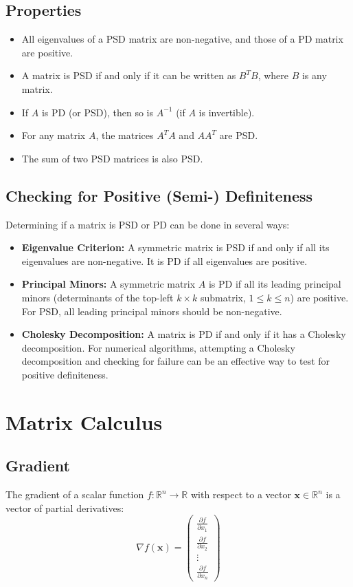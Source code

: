 \documentclass[8pt, a4paper, landscape, includeheadfoot]{extarticle}
\begin{document}
\begin{multicols*}{4}
	\subsection{Properties}
	\begin{itemize}
		\item All eigenvalues of a PSD matrix are non-negative, and those of a PD matrix are positive.
		\item A matrix is PSD if and only if it can be written as \( B^T B \), where \( B \) is any matrix.
		\item If \( A \) is PD (or PSD), then so is \( A^{-1} \) (if \( A \) is invertible).
		\item For any matrix \( A \), the matrices \( A^T A \) and \( AA^T \) are PSD.
		\item The sum of two PSD matrices is also PSD.
	\end{itemize}

	\subsection{Checking for Positive (Semi-) Definiteness}
	Determining if a matrix is PSD or PD can be done in several ways:

	\begin{itemize}
		\item \textbf{Eigenvalue Criterion:} A symmetric matrix is PSD if and only if all its eigenvalues are non-negative. It is PD if all eigenvalues are positive.
		\item \textbf{Principal Minors:} A symmetric matrix \( A \) is PD if all its leading principal minors (determinants of the top-left \( k \times k \) submatrix, \( 1 \leq k \leq n \)) are positive. For PSD, all leading principal minors should be non-negative.
		\item \textbf{Cholesky Decomposition:} A matrix is PD if and only if it has a Cholesky decomposition. For numerical algorithms, attempting a Cholesky decomposition and checking for failure can be an effective way to test for positive definiteness.
	\end{itemize}

	\section{Matrix Calculus}
	\subsection{Gradient}
	The gradient of a scalar function $f: \mathbb{R}^n \rightarrow \mathbb{R}$ with respect to a vector $\mathbf{x} \in \mathbb{R}^n$ is a vector of partial derivatives:
	$$
		\nabla f(\mathbf{x}) = \begin{pmatrix}
			\frac{\partial f}{\partial x_1} \\
			\frac{\partial f}{\partial x_2} \\
			\vdots                          \\
			\frac{\partial f}{\partial x_n}
		\end{pmatrix}
	$$


\end{multicols*}
\end{document}
